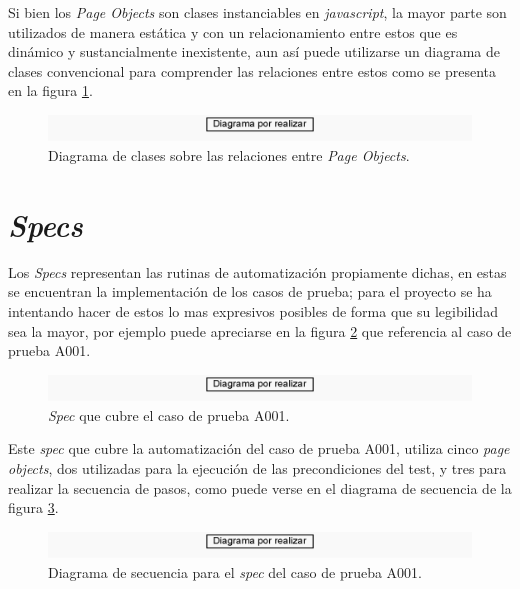 Si bien los \emph{Page Objects} son clases instanciables en \emph{javascript},
la mayor parte son utilizados de manera estática y con un relacionamiento
entre estos que es dinámico y sustancialmente inexistente, aun así puede
utilizarse un diagrama de clases convencional para comprender las relaciones
entre estos como se presenta en la figura \ref{pom}.

\begin{figure}
\centering
\includegraphics[width=1.0\textwidth]{graphics/diagram00.eps}
\caption{Diagrama de clases sobre las relaciones entre \emph{Page Objects}.}
\label{pom}
\end{figure}

\section{\emph{Specs}}
Los \emph{Specs} representan las rutinas de automatización propiamente dichas,
en estas se encuentran la implementación de los casos de prueba; para el
proyecto se ha intentando hacer de estos lo mas expresivos posibles de forma
que su legibilidad sea la mayor, por ejemplo puede apreciarse en la figura
\ref{spec} que referencia al caso de prueba A001.

\begin{figure}
\centering
\includegraphics[width=1.0\textwidth]{graphics/diagram00.eps}
\caption{\emph{Spec} que cubre el caso de prueba A001.}
\label{spec}
\end{figure}

Este \emph{spec} que cubre la automatización del caso de prueba A001, utiliza
cinco \emph{page objects}, dos utilizadas para la ejecución de las
precondiciones del test, y tres para realizar la secuencia de pasos, como puede
verse en el diagrama de secuencia de la figura \ref{sequence}.

\begin{figure}
\centering
\includegraphics[width=1.0\textwidth]{graphics/diagram00.eps}
\caption{Diagrama de secuencia para el \emph{spec} del caso de prueba A001.}
\label{sequence}
\end{figure}

